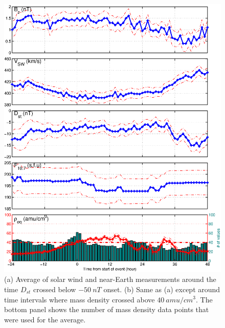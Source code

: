 \documentclass[10pt,twocolumn]{article}
\begin{document}
\begin{figure}[htp!]
\includegraphics[scale=0.45]{paperfigures/stormavs-mass.eps}
\caption{(a) Average of solar wind and near-Earth measurements around the time $D_{st}$ crossed below $-50~nT$ onset. (b) Same as (a) except around time intervals where mass density crossed above $40~amu/cm^3$.  The bottom panel shows the number of mass density data points that were used for the average.}
\label{Storms}
\end{figure}
\clearpage
\end{document}
